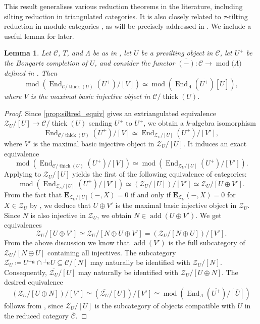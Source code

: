 \documentclass[10pt,twoside, a4paper,reqno]{amsart}
\DeclareMathOperator{\mods}{mod}
\DeclareMathOperator{\End}{End}
\DeclareMathOperator{\add}{add}
\DeclareMathOperator{\thick}{thick}
\newcommand{\calC}{\mathcal{C}}
\newcommand{\calZ}{\mathcal{Z}}
\newcommand{\E}{\mathbf{E}}
\newtheorem{lemma}[theorem]{Lemma}
\theoremstyle{definition}
\begin{document}
This result generalises various reduction theorems in the literature, including silting reduction \cite{AI12,IY18} in triangulated categories. It is also closely related to $\tau$-tilting reduction in module categories \cite{Jas15}, as will be precisely addressed in . We include a useful lemma for later.

\begin{lemma}\label{lem:endoinred} 
	Let $\calC$, $T$, and $\Lambda$ be as in , let $U$ be a presilting object in $\calC$, let $U^+$ be the Bongartz completion of $U$, and consider the functor $\overline{(-)}\colon \calC \longrightarrow \mods{(}\Lambda{)}$ defined in . Then
	\[ \mods( \End_{\calC/\thick(U)}(U^+)/[V]) \simeq \mods(\End_{\Lambda}(\overline{U^+})[\overline{U}]), \]
	where $V$ is the maximal basic injective object in $\calC/\thick(U)$. 
\end{lemma}
\begin{proof}
	Since \eqref{prop:siltred_equiv} gives an extriangulated equivalence ${\calZ_U}/[U] \rightarrow \calC/\thick(U)$ sending $U^+$ to $U^+$, we obtain a $k$-algebra isomorphism
	\[\End_{\calC/\thick(U)}(U^+)/[V] \simeq \End_{\calZ_U/[U]}(U^+)/[V'], \]
	where $V'$ is the maximal basic injective object in $\calZ_U/[U]$. 
	 It induces an exact equivalence
	\[ \mods( \End_{\calC/\thick(U)}(U^+)/[V]) \simeq \mods(\End_{\calZ_U/[U]}(U^+)/[V']). \]
	Applying  to $\calZ_U/[U]$ yields the first of the following equivalence of categories:	
	\[\mods(\End_{\calZ_U/[U]}(U^+)/[V']) \simeq (\calZ_U/[U])/[V'] \simeq \calZ_U/[U\oplus V'].   \] 
	From the fact that $\E_{\calZ_U/[U]}(-,X)=0$ if and only if $\E_{\calZ_U}(-, X)=0$ for $X \in \calZ_U$ by \cite[Prop. 2.9(2)]{GNP23}, we deduce that $U \oplus V'$ is the maximal basic injective object in $\calZ_U$. Since $N$ is also injective in $\calZ_U$, we obtain $N \in \add (U \oplus V')$. We get equivalences
	\[ \calZ_U/[U\oplus V'] \simeq \calZ_U/[N \oplus U\oplus V'] = (\calZ_U/[N \oplus U])/[V']. \] 
	From the above discussion we know that $\add(V')$ is the full subcategory of $\calZ_U/[N \oplus U]$ containing all injectives. The subcategory $\overline{\calZ_U} \coloneqq U^{\perp_{\overline{\E}}} \cap {^{\perp_{\overline{\E}}}U} \subseteq \calC/[N]$ may naturally be identified with $\calZ_U/[N]$. Consequently, $\overline{\calZ_U}/[U]$ may naturally be identified with $\calZ_U/[U \oplus N]$. The desired equivalence
	\[ (\calZ_{U}/[U \oplus N])/[V']  \simeq (\overline{\calZ_U}/[U])/[V'] \simeq \mods(\End_{\Lambda}({\overline{U^+}})/[\overline{U}])\] 
follows from \cite[Above Thm. 4.22 on p. 18]{PZ24}, since $\overline{\calZ_U}/[U]$ is the subcategory of objects compatible with $U$ in the reduced category $\overline{\calC}$.
\end{proof}
\end{document}
